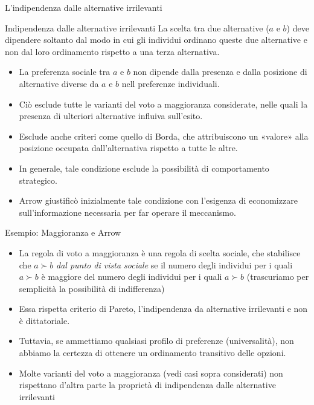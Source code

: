 \documentclass[aspectratio=64,11pt]{beamer}
\begin{document}
\begin{frame}{L'indipendenza dalle alternative irrilevanti}
\begin{block}{Indipendenza dalle alternative irrilevanti}
La scelta tra due alternative ($a$ e $b$) deve dipendere \alert{soltanto} dal modo
in cui gli individui ordinano queste due alternative e non dal loro
ordinamento rispetto a una terza alternativa.
\end{block}

\begin{itemize}
\item La preferenza sociale tra $a$ e $b$ non dipende dalla presenza e dalla
posizione di alternative diverse da $a$ e $b$ nell preferenze individuali.
\item Ciò esclude tutte le varianti del voto a maggioranza considerate, nelle
quali la presenza di ulteriori alternative influiva sull'esito.
\item Esclude anche criteri come quello di Borda, che attribuiscono un «valore»
alla posizione occupata dall'alternativa rispetto a tutte le altre.
\item In generale, tale condizione esclude la possibilità di comportamento
strategico.
\item Arrow giustificò inizialmente tale condizione con l'esigenza di economizzare
sull'informazione necessaria per far operare il meccanismo.
\end{itemize}
\end{frame}

\begin{frame}{Esempio: Maggioranza e Arrow}
\begin{itemize}
\item La regola di voto a maggioranza è una regola di scelta sociale, che
stabilisce che $a\succ b$ \emph{dal punto di vista sociale} se il numero degli
individui per i quali $a\succ b$ è maggiore del numero degli individui per i
quali $a\succ b$ (trascuriamo per semplicità la possibilità di indifferenza)
\item Essa rispetta criterio di Pareto, l'indipendenza da alternative irrilevanti
e non è dittatoriale.
\item Tuttavia, se ammettiamo qualsiasi profilo di preferenze (universalità), non
abbiamo la certezza di ottenere un ordinamento transitivo delle opzioni.
\item Molte varianti del voto a maggioranza (vedi casi sopra considerati) non
rispettano d'altra parte la proprietà di indipendenza dalle alternative
irrilevanti
\end{itemize}
\end{frame}
\end{document}
